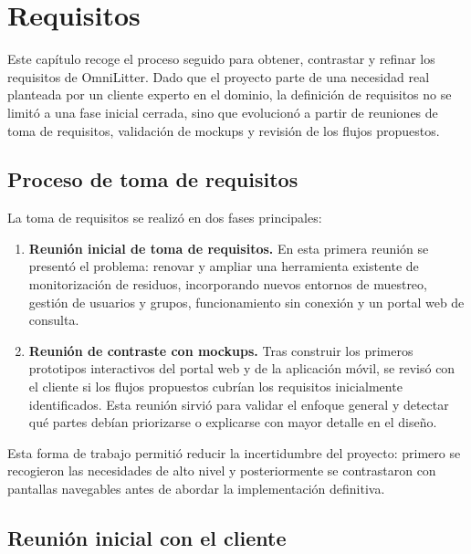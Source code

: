 
\section{Requisitos}
\label{sec:requisitos}

Este capítulo recoge el proceso seguido para obtener, contrastar y refinar los
requisitos de OmniLitter. Dado que el proyecto parte de una necesidad real
planteada por un cliente experto en el dominio, la definición de requisitos no se
limitó a una fase inicial cerrada, sino que evolucionó a partir de reuniones de
toma de requisitos, validación de mockups y revisión de los flujos propuestos.

\subsection{Proceso de toma de requisitos}

La toma de requisitos se realizó en dos fases principales:

\begin{enumerate}
  \item \textbf{Reunión inicial de toma de requisitos.} En esta primera reunión se
    presentó el problema: renovar y ampliar una herramienta existente de
    monitorización de residuos, incorporando nuevos entornos de muestreo, gestión
    de usuarios y grupos, funcionamiento sin conexión y un portal web de consulta.
  \item \textbf{Reunión de contraste con mockups.} Tras construir los primeros
    prototipos interactivos del portal web y de la aplicación móvil, se revisó con
    el cliente si los flujos propuestos cubrían los requisitos inicialmente
    identificados. Esta reunión sirvió para validar el enfoque general y detectar
    qué partes debían priorizarse o explicarse con mayor detalle en el diseño.
\end{enumerate}

Esta forma de trabajo permitió reducir la incertidumbre del proyecto: primero se
recogieron las necesidades de alto nivel y posteriormente se contrastaron con
pantallas navegables antes de abordar la implementación definitiva.

\subsection{Reunión inicial con el cliente}

